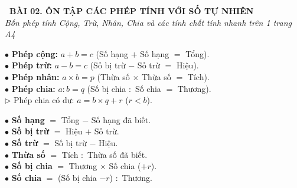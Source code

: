 \documentclass[14pt,a4paper,oneside]{extbook}
\begin{document}
\noindent
\begin{tcolorbox}[
  enhanced,
  colback=teal!8!white,
  colframe=teal!80!black,
  arc=3mm,
  boxrule=1.1pt,
  width=\linewidth,
  halign=center,
  top=2.2mm, bottom=2.2mm,
  left=3mm, right=3mm,
  drop fuzzy shadow
]
  {\large\bfseries\color{teal!95!black}\faBookmark\ BÀI 02. ÔN TẬP CÁC PHÉP TÍNH VỚI SỐ TỰ NHIÊN}\\[2pt]
  {\scriptsize\color{black!75}\itshape Bốn phép tính Cộng, Trừ, Nhân, Chia và các tính chất tính nhanh trên 1 trang A4}
\end{tcolorbox}

\vspace{3.2mm}
\noindent
\begin{minipage}[t]{0.52\textwidth}
  \begin{tcolorbox}[
    enhanced,
    title={\footnotesize\bfseries\color{white}\faCalculator\ 1. Thành phần các phép tính},
    colback=blue!2!white,
    colframe=blue!75!black,
    arc=2.5mm, boxrule=0.8pt, top=1.8mm, bottom=1.8mm, left=2.2mm, right=2.2mm
  ]
    \footnotesize
    $\bullet$ \textbf{Phép cộng:} $a + b = c$ (Số hạng $+$ Số hạng $=$ Tổng).\\
    $\bullet$ \textbf{Phép trừ:} $a - b = c$ (Số bị trừ $-$ Số trừ $=$ Hiệu).\\
    $\bullet$ \textbf{Phép nhân:} $a \times b = p$ (Thừa số $\times$ Thừa số $=$ Tích).\\
    $\bullet$ \textbf{Phép chia:} $a : b = q$ (Số bị chia $:$ Số chia $=$ Thương).\\
    \hspace*{3mm}$\triangleright$ Phép chia có dư: $a = b \times q + r$ ($r < b$).
  \end{tcolorbox}
\end{minipage}%
\hfill
\begin{minipage}[t]{0.46\textwidth}
  \begin{tcolorbox}[
    enhanced,
    title={\footnotesize\bfseries\color{white}\faSearch\ 2. Tìm thành phần chưa biết},
    colback=teal!2!white,
    colframe=teal!75!black,
    arc=2.5mm, boxrule=0.8pt, top=1.8mm, bottom=1.8mm, left=2mm, right=2mm
  ]
    \footnotesize
    $\bullet$ \textbf{Số hạng} $=$ Tổng $-$ Số hạng đã biết.\\
    $\bullet$ \textbf{Số bị trừ} $=$ Hiệu $+$ Số trừ.\\
    $\bullet$ \textbf{Số trừ} $=$ Số bị trừ $-$ Hiệu.\\
    $\bullet$ \textbf{Thừa số} $=$ Tích $:$ Thừa số đã biết.\\
    $\bullet$ \textbf{Số bị chia} $=$ Thương $\times$ Số chia ($+ r$).\\
    $\bullet$ \textbf{Số chia} $=$ (Số bị chia $- r$) $:$ Thương.
  \end{tcolorbox}
\end{minipage}
\end{document}
